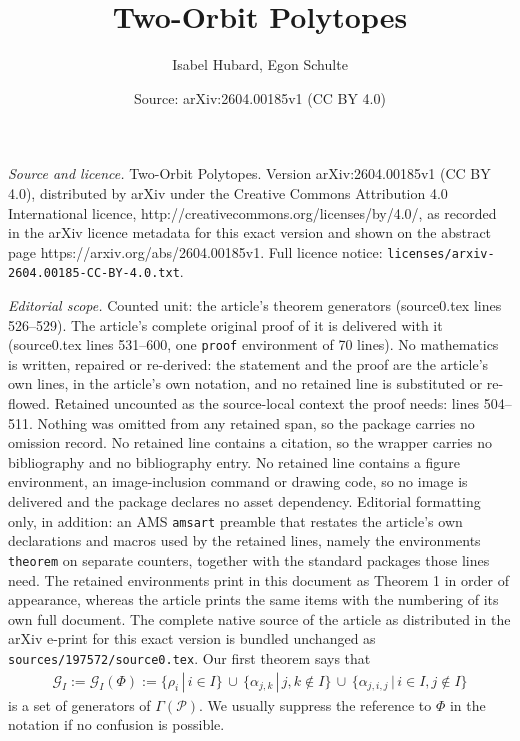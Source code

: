\documentclass[10pt,a4paper]{amsart}
\title{Two-Orbit Polytopes}
\author{Isabel Hubard, Egon Schulte}
\date{Source: arXiv:2604.00185v1 (CC BY 4.0)}
\begin{document}
\maketitle

\noindent\emph{Source and licence.} Two-Orbit Polytopes. Version arXiv:2604.00185v1 (CC BY 4.0), distributed by arXiv under the Creative Commons Attribution 4.0 International licence, http://creativecommons.org/licenses/by/4.0/, as recorded in the arXiv licence metadata for this exact version and shown on the abstract page https://arxiv.org/abs/2604.00185v1. Full licence notice: \texttt{licenses/arxiv-2604.00185-CC-BY-4.0.txt}.\par\smallskip

\noindent\textit{Editorial scope.} Counted unit: the article's theorem generators (source0.tex lines 526--529). The article's complete original proof of it is delivered with it (source0.tex lines 531--600, one \texttt{proof} environment of 70 lines). No mathematics is written, repaired or re-derived: the statement and the proof are the article's own lines, in the article's own notation, and no retained line is substituted or re-flowed.  Retained uncounted as the source-local context the proof needs: lines 504--511.  Nothing was omitted from any retained span, so the package carries no omission record.  No retained line contains a citation, so the wrapper carries no bibliography and no bibliography entry.  No retained line contains a figure environment, an image-inclusion command or drawing code, so no image is delivered and the package declares no asset dependency.  Editorial formatting only, in addition: an AMS \texttt{amsart} preamble that restates the article's own declarations and macros used by the retained lines, namely the environments \texttt{theorem} on separate counters, together with the standard packages those lines need.  The retained environments print in this document as Theorem 1 in order of appearance, whereas the article prints the same items with the numbering of its own full document.  The complete native source of the article as distributed in the arXiv e-print for this exact version is bundled unchanged as \texttt{sources/197572/source0.tex}.
Our first theorem says that  
\begin{eqnarray}
\label{gi}
\mathcal{G}_{I} :=\mathcal{G}_{I}(\Phi):= 
\{ \rho_i \,|\, i \in I\} \,\cup\, \{\alpha_{j,k}\,|\, j,k \notin I   \} \,\cup\, \{ \alpha_{j,i,j} \,|\, i \in I, j \notin I \}
\end{eqnarray}
is a set of generators of $\Gamma(\mathcal{P})$. We usually suppress the reference to $\Phi$ in the notation if no confusion is possible.
\smallskip
\end{document}
